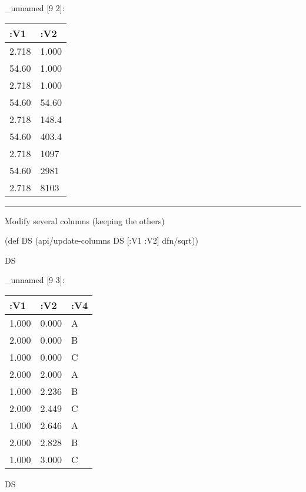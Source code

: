 \documentclass[]{article}
\newenvironment{Shaded}{\begin{snugshade}}{\end{snugshade}}
\newcommand{\KeywordTok}[1]{\textcolor[rgb]{0.13,0.29,0.53}{\textbf{#1}}}
\newcommand{\DecValTok}[1]{\textcolor[rgb]{0.00,0.00,0.81}{#1}}
\newcommand{\FunctionTok}[1]{\textcolor[rgb]{0.00,0.00,0.00}{#1}}
\newcommand{\VariableTok}[1]{\textcolor[rgb]{0.00,0.00,0.00}{#1}}
\newcommand{\BuiltInTok}[1]{#1}
\newcommand{\AttributeTok}[1]{\textcolor[rgb]{0.77,0.63,0.00}{#1}}
\newcommand{\NormalTok}[1]{#1}
\begin{document}
\_unnamed {[}9 2{]}:

\begin{longtable}[]{@{}ll@{}}
\toprule
:V1 & :V2\tabularnewline
\midrule
\endhead
2.718 & 1.000\tabularnewline
54.60 & 1.000\tabularnewline
2.718 & 1.000\tabularnewline
54.60 & 54.60\tabularnewline
2.718 & 148.4\tabularnewline
54.60 & 403.4\tabularnewline
2.718 & 1097\tabularnewline
54.60 & 2981\tabularnewline
2.718 & 8103\tabularnewline
\bottomrule
\end{longtable}

\begin{center}\rule{0.5\linewidth}{0.5pt}\end{center}

Modify several columns (keeping the others)

\begin{Shaded}
\begin{Highlighting}[]
\NormalTok{(}\BuiltInTok{def}\FunctionTok{ DS }\NormalTok{(api/update-columns DS [}\AttributeTok{:V1} \AttributeTok{:V2}\NormalTok{] dfn/sqrt))}
\end{Highlighting}
\end{Shaded}

\begin{Shaded}
\begin{Highlighting}[]
\NormalTok{DS}
\end{Highlighting}
\end{Shaded}

\_unnamed {[}9 3{]}:

\begin{longtable}[]{@{}lll@{}}
\toprule
:V1 & :V2 & :V4\tabularnewline
\midrule
\endhead
1.000 & 0.000 & A\tabularnewline
2.000 & 0.000 & B\tabularnewline
1.000 & 0.000 & C\tabularnewline
2.000 & 2.000 & A\tabularnewline
1.000 & 2.236 & B\tabularnewline
2.000 & 2.449 & C\tabularnewline
1.000 & 2.646 & A\tabularnewline
2.000 & 2.828 & B\tabularnewline
1.000 & 3.000 & C\tabularnewline
\bottomrule
\end{longtable}

\begin{Shaded}
\end{Shaded}

\begin{Shaded}
\begin{Highlighting}[]
\NormalTok{DS}
\end{Highlighting}
\end{Shaded}
\end{document}
